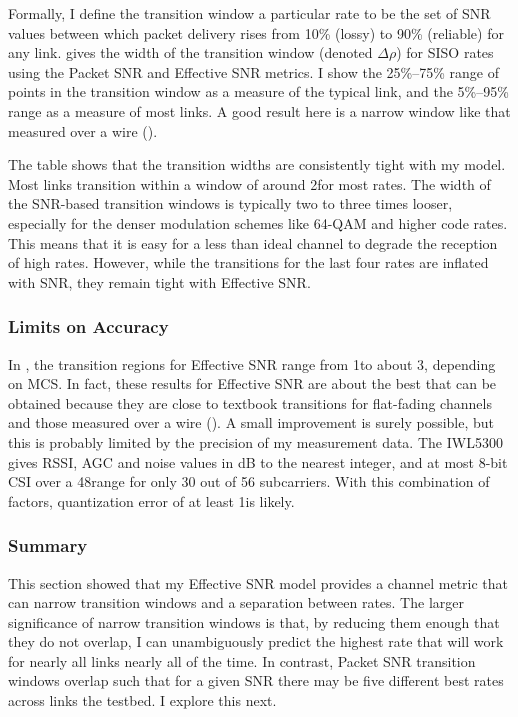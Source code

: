 Formally, I define the transition window a particular rate to be the set of SNR values between which packet delivery rises from 10\% (lossy) to 90\% (reliable) for any link.  gives the width of the transition window (denoted $\Delta\rho$) for SISO rates using the Packet SNR and Effective SNR metrics. I show the 25\%--75\% range of points in the transition window as a measure of the typical link, and the 5\%--95\% range as a measure of most links. A good result here is a narrow window like that measured over a wire ().

The table shows that the transition widths are consistently tight with my model. Most links transition within a window of around 2\dB for most rates. The width of the SNR-based transition windows is typically two to three times looser, especially for the denser modulation schemes like 64-QAM and higher code rates. This means that it is easy for a less than ideal channel to degrade the reception of high rates. However, while the transitions for the last four rates are inflated with SNR, they remain tight with Effective SNR.

\subsubsection{Limits on Accuracy}
In , the transition regions for Effective SNR range from 1\dB to about 3\dB, depending on MCS. In fact, these results for Effective SNR are about the best that can be obtained because they are close to textbook transitions for flat-fading channels and those measured over a wire (). A small improvement is surely possible, but this is probably limited by the precision of my measurement data. The IWL5300 gives RSSI, AGC and noise values in dB to the nearest integer, and at most 8-bit CSI over a 48\dB range for only 30 out of 56 subcarriers. With this combination of factors, quantization error of at least 1\dB is likely.

\subsubsection{Summary}
This section showed that my Effective SNR model provides a channel metric that can narrow transition windows and a separation between rates. The larger significance of narrow transition windows is that, by reducing them enough that they do not overlap, I can unambiguously predict the highest rate that will work for nearly all links nearly all of the time. In contrast, Packet SNR transition windows overlap such that for a given SNR there may be five different best rates across links the testbed. I explore this next.

